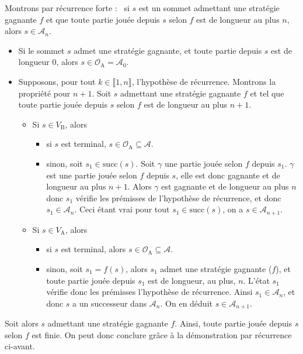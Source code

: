 \begin{prv}
	Montrons par récurrence forte : \guillemotleft~si $s$ est un sommet admettant une stratégie gagnante $f$ et que toute partie jouée depuis $s$ selon $f$ est de longueur au plus $n$, alors $s \in \mathcal{A}_n$.~\guillemotright\ 
	\begin{itemize}
		\item Si le sommet $s$ admet une stratégie gagnante, et toute partie depuis $s$ est de longueur $0$, alors $s \in \mathcal{O}_\mathrm{A} = \mathcal{A}_0$.
		\item Supposons, pour tout $k \in \llbracket 1,n \rrbracket$, l'hypothèse de récurrence. Montrons la propriété pour $n + 1$. Soit $s$\/ admettant une stratégie gagnante $f$ et tel que toute partie jouée depuis $s$ selon $f$ est de longueur au plus $n+1$.
			\begin{itemize}
				\item Si $s \in V_\mathrm{B}$, alors
					\begin{itemize}
						\item si $s$ est terminal, $s \in \mathcal{O}_\mathrm{A} \subseteq \mathcal{A}$.
						\item sinon, soit $s_1 \in \mathrm{succ}(s)$. Soit $\gamma$\/ une partie jouée selon $f$ depuis $s_1$. $\gamma$ est une partie jouée selon $f$ depuis $s$, elle est donc gagnante et de longueur au plus $n + 1$. Alors $\gamma$\/ est gagnante et de longueur au plus $n$ donc $s_1$ vérifie les prémisses de l'hypothèse de récurrence, et donc $s_1 \in \mathcal{A}_n$. Ceci étant vrai pour tout $s_1 \in \mathrm{succ}(s)$, on a $s \in \mathcal{A}_{n+1}$.
					\end{itemize}
				\item Si $s \in V_\mathrm{A}$, alors
					\begin{itemize}
						\item si $s$ est terminal, alors $s \in \mathcal{O}_\mathrm{A} \subseteq \mathcal{A}$.
						\item sinon, soit $s_1 = f(s)$, alors $s_1$ admet une stratégie gagnante ($f$), et toute partie jouée depuis $s_1$ est de longueur, au plus, $n$. L'état $s_1$ vérifie donc les prémisses l'hypothèse de récurrence. Ainsi $s_1 \in \mathcal{A}_n$, et donc $s$\/ a un successeur dans $\mathcal{A}_n$. On en déduit $s \in \mathcal{A}_{n+1}$.
					\end{itemize}
			\end{itemize}
	\end{itemize}
	Soit alors $s$ admettant une stratégie gagnante $f$. Ainsi, toute partie jouée depuis $s$ selon $f$ est finie. On peut donc conclure grâce à la démonstration par récurrence ci-avant.
\end{prv}


